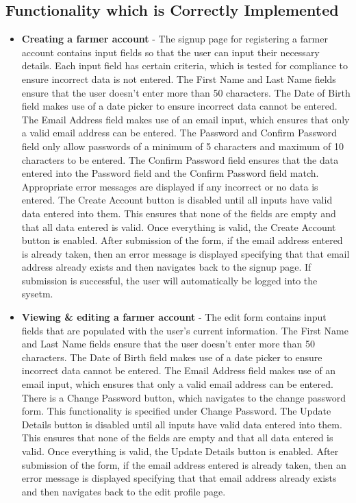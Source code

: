 \documentclass[11pt,fleqn]{book} %
\begin{document}
		\subsection{Functionality which is Correctly Implemented}
			\begin{itemize}
				\item\textbf{Creating a farmer account} -
				The signup page for registering a farmer account contains input fields so that the user can input their necessary details. Each input field has certain criteria, which is tested for compliance to ensure incorrect data is not entered. The First Name and Last Name fields ensure that the user doesn't enter more than 50 characters. The Date of Birth field makes use of a date picker to ensure incorrect data cannot be entered. The Email Address field makes use of an email input, which ensures that only a valid email address can be entered. The Password and Confirm Password field only allow passwords of a minimum of 5 characters and maximum of 10 characters to be entered. The Confirm Password field ensures that the data entered into the Password field and the Confirm Password field match. Appropriate error messages are displayed if any incorrect or no data is entered. The Create Account button is disabled until all inputs have valid data entered into them. This ensures that none of the fields are empty and that all data entered is valid. Once everything is valid, the Create Account button is enabled. After submission of the form, if the email address entered is already taken, then an error message is displayed specifying that that email address already exists and then navigates back to the signup page. If submission is successful, the user will automatically be logged into the sysetm.
				
				\item\textbf{Viewing \& editing a farmer account} - 
				The edit form contains input fields that are populated with the user's current information. The First Name and Last Name fields ensure that the user doesn't enter more than 50 characters. The Date of Birth field makes use of a date picker to ensure incorrect data cannot be entered. The Email Address field makes use of an email input, which ensures that only a valid email address can be entered. There is a Change Password button, which navigates to the change password form. This functionality is specified under Change Password. The Update Details button is disabled until all inputs have valid data entered into them. This ensures that none of the fields are empty and that all data entered is valid. Once everything is valid, the Update Details button is enabled. After submission of the form, if the email address entered is already taken, then an error message is displayed specifying that that email address already exists and then navigates back to the edit profile page.
				

\end{itemize}
\end{document}
